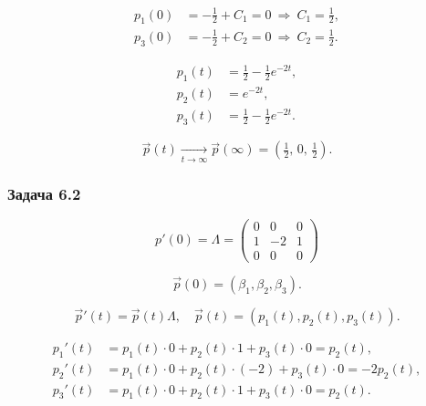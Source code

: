 \[
	\begin{aligned}
		p_1(0) & = -\tfrac{1}{2}+C_1=0 \ \Rightarrow\ C_1=\tfrac{1}{2}, \\
		p_3(0) & = -\tfrac{1}{2}+C_2=0 \ \Rightarrow\ C_2=\tfrac{1}{2}.
	\end{aligned}
\]

\[
	\begin{aligned}
		p_1(t) & = \tfrac{1}{2}-\tfrac{1}{2}e^{-2t}, \\
		p_2(t) & = e^{-2t},                          \\
		p_3(t) & = \tfrac{1}{2}-\tfrac{1}{2}e^{-2t}.
	\end{aligned}
\]

\[
	\vec{p}(t)\xrightarrow[t\to\infty]{}\vec{p}(\infty)=\left(\tfrac{1}{2},\,0,\,\tfrac{1}{2}\right).
\]

\subsubsection*{Задача 6.2}


\[
	p'(0)=\Lambda =
	\begin{pmatrix}
		0 & 0  & 0 \\
		1 & -2 & 1 \\
		0 & 0  & 0
	\end{pmatrix}
\]


\[
	\vec{p}(0) = (\beta_1,\beta_2,\beta_3).
\]

\[
	\vec{p}'(t) = \vec{p}(t)\Lambda,\quad \vec{p}(t)=(p_1(t),p_2(t),p_3(t)).
\]

\[
	\begin{aligned}
		p_1'(t) & = p_1 (t)\cdot 0 + p_2(t)\cdot 1 + p_3(t)\cdot 0 = p_2(t),     \\
		p_2'(t) & = p_1 (t)\cdot 0 + p_2(t)\cdot(-2) + p_3(t)\cdot 0 = -2p_2(t), \\
		p_3'(t) & = p_1 (t)\cdot 0 + p_2(t)\cdot 1 + p_3(t)\cdot 0 = p_2(t).
	\end{aligned}
\]

